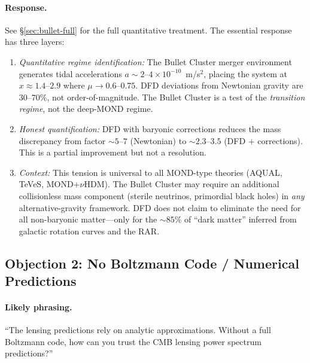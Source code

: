 \documentclass[11pt,a4paper]{article}
\begin{document}
\paragraph{Response.}
See \S\ref{sec:bullet-full} for the full quantitative treatment.  The
essential response has three layers:

\begin{enumerate}[label=(\alph*)]
\item \emph{Quantitative regime identification:} The Bullet Cluster merger
  environment generates tidal accelerations $a \sim 2$--$4 \times 10^{-10}$~m/s$^2$,
  placing the system at $x \approx 1.4$--$2.9$ where $\mu \to 0.6$--$0.75$.
  DFD deviations from Newtonian gravity are $30$--$70\%$, not order-of-magnitude.
  The Bullet Cluster is a test of the \emph{transition regime}, not the deep-MOND
  regime.

\item \emph{Honest quantification:} DFD with baryonic corrections reduces the
  mass discrepancy from factor $\sim 5$--$7$ (Newtonian) to $\sim 2.3$--$3.5$
  (DFD + corrections).  This is a partial improvement but not a resolution.

\item \emph{Context:} This tension is universal to all MOND-type theories
  (AQUAL, TeVeS, MOND+$\nu$HDM).  The Bullet Cluster may require an
  additional collisionless mass component (sterile neutrinos, primordial
  black holes) in \emph{any} alternative-gravity framework.  DFD does not
  claim to eliminate the need for all non-baryonic matter---only for the
  $\sim 85\%$ of ``dark matter'' inferred from galactic rotation curves
  and the RAR.
\end{enumerate}

\subsection{Objection 2: No Boltzmann Code / Numerical Predictions}

\paragraph{Likely phrasing.}
``The lensing predictions rely on analytic approximations. Without a full
Boltzmann code, how can you trust the CMB lensing power spectrum predictions?''
\end{document}
